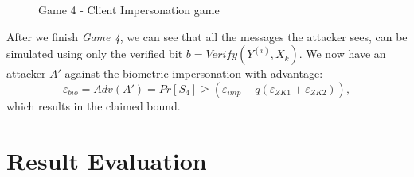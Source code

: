 \begin{figure}[htbp!] 
  \centering
  \caption{Game 4 - Client Impersonation game}
  \label{fig:game3protocol1client}
\end{figure}
After we finish \textit{Game 4}, we can see that all the messages the attacker
sees, can be simulated using only the verified bit $b = Verify(Y^{(i)},
X_k)$. We now have an attacker $A'$ against the biometric impersonation with
advantage:
\[
\varepsilon_{bio} = Adv(A') = Pr[S_4] \geq (\varepsilon_{imp} - q(\varepsilon_{ZK1}+\varepsilon_{ZK2})) ,
\]
which results in the claimed bound.


\section{Result Evaluation}

